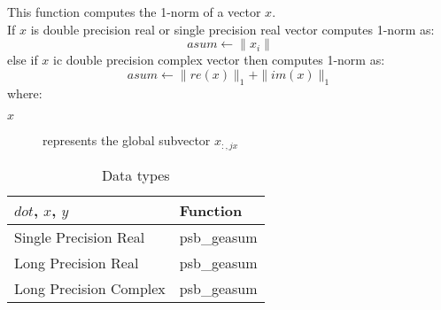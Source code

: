 %
%



This function computes the 1-norm of a vector $x$.\\
If $x$ is double precision real or single precision real vector
computes 1-norm as:
\[ asum \leftarrow  \|x_i\|\]
else if $x$ ic double precision complex vector then computes 1-norm  as:
\[ asum \leftarrow \|re(x)\|_1 + \|im(x)\|_1\]
where:
\begin{description}
\item[$x$] represents the global subvector $x_{:,jx}$
\end{description}


\begin{table}[h]
\begin{center}
\begin{tabular}{ll}
\hline
$dot$, $x$, $y$ & {\bf Function}\\
\hline
Single Precision Real & psb\_geasum\\
Long Precision Real & psb\_geasum \\
Long Precision Complex & psb\_geasum \\	
\hline
\end{tabular}
\end{center}
\caption{Data types\label{tab:f90asum}}
\end{table}

